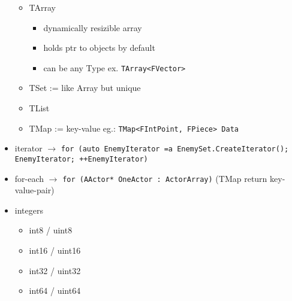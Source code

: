 \begin{itemize}
            \begin{itemize}
                \item TArray
                \begin{itemize}
                    \item dynamically resizible array
                    \item holds ptr to objects by default
                    \item can be any Type ex. \colorbox{mygray}{\lstinline{TArray<FVector>}}
                \end{itemize}
                \item TSet := like Array but unique
                \item TList
                \item TMap := key-value eg.: \colorbox{mygray}{\lstinline{TMap<FIntPoint, FPiece> Data}}
            \end{itemize}
            \item iterator $\rightarrow$ \colorbox{mygray}{\lstinline{for (auto EnemyIterator =a EnemySet.CreateIterator(); EnemyIterator; ++EnemyIterator)}}
            \item for-each $\rightarrow$ \colorbox{mygray}{\lstinline{for (AActor* OneActor : ActorArray)}} (TMap return key-value-pair)
            \item integers
            \begin{itemize}
                \item int8 / uint8
                \item int16 / uint16
                \item int32 / uint32
                \item int64 / uint64
            \end{itemize}
        \end{itemize}
